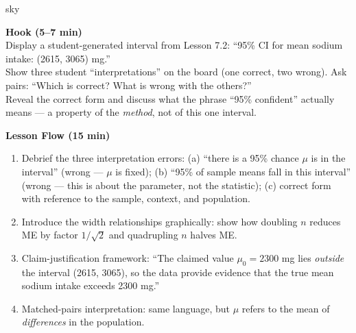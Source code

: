 \documentclass[10pt]{article}
\begin{document}
\begin{skillbox}{sky}
\begin{minipage}[t]{0.48\linewidth}
    \textbf{Hook (5--7 min)}\\
    Display a student-generated interval from Lesson 7.2:
    ``95\% CI for mean sodium intake: (2615, 3065) mg.''\\[4pt]
    Show three student ``interpretations'' on the board (one correct, two wrong).
    Ask pairs: ``Which is correct? What is wrong with the others?''\\[4pt]
    Reveal the correct form and discuss what the phrase ``95\% confident'' actually
    means --- a property of the \emph{method}, not of this one interval.
\end{minipage}
\hfill
\begin{minipage}[t]{0.48\linewidth}
    \textbf{Lesson Flow (15 min)}
    \begin{enumerate}
        \item Debrief the three interpretation errors: (a) ``there is a 95\%
              chance $\mu$ is in the interval'' (wrong --- $\mu$ is fixed); (b)
              ``95\% of sample means fall in this interval'' (wrong --- this is about
              the parameter, not the statistic); (c) correct form with reference to
              the sample, context, and population.
        \item Introduce the width relationships graphically: show how doubling $n$
              reduces ME by factor $1/\sqrt{2}$ and quadrupling $n$ halves ME.
        \item Claim-justification framework: ``The claimed value $\mu_0 = 2300$ mg
              lies \emph{outside} the interval (2615, 3065), so the data provide
              evidence that the true mean sodium intake exceeds 2300 mg.''
        \item Matched-pairs interpretation: same language, but $\mu$ refers to the
              mean of \emph{differences} in the population.
    \end{enumerate}
\end{minipage}
\end{skillbox}
\end{document}

